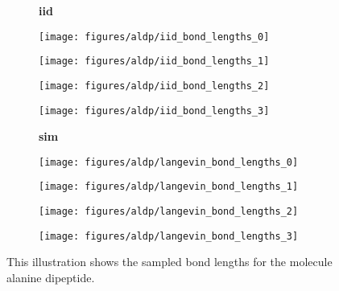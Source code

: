 \begin{figure}
    \centering
    \begin{minipage}{\textwidth}
        \centering
        \begin{subfigure}[c]{0.08\textwidth}
            \textbf{iid}
        \end{subfigure}
        \begin{subfigure}[c]{0.2\textwidth}
            \centering
            \texttt{[image: figures/aldp/iid\_bond\_lengths\_0]}
        \end{subfigure}
        \begin{subfigure}[c]{0.2\textwidth}
            \centering
            \texttt{[image: figures/aldp/iid\_bond\_lengths\_1]}
        \end{subfigure}
        \begin{subfigure}[c]{0.2\textwidth}
            \centering
            \texttt{[image: figures/aldp/iid\_bond\_lengths\_2]}
        \end{subfigure}
        \begin{subfigure}[c]{0.2\textwidth}
            \centering
            \texttt{[image: figures/aldp/iid\_bond\_lengths\_3]}
        \end{subfigure}
    \end{minipage}
    \vspace{0.5cm}
    \begin{minipage}{\textwidth}
        \centering
        \begin{subfigure}[c]{0.08\textwidth}
            \vspace{-0.5cm}
            \textbf{sim}
        \end{subfigure}
        \begin{subfigure}[c]{0.2\textwidth}
            \centering
            \texttt{[image: figures/aldp/langevin\_bond\_lengths\_0]}
        \end{subfigure}
        \begin{subfigure}[c]{0.2\textwidth}
            \centering
            \texttt{[image: figures/aldp/langevin\_bond\_lengths\_1]}
        \end{subfigure}
        \begin{subfigure}[c]{0.2\textwidth}
            \centering
            \texttt{[image: figures/aldp/langevin\_bond\_lengths\_2]}
        \end{subfigure}
        \begin{subfigure}[c]{0.2\textwidth}
            \centering
            \texttt{[image: figures/aldp/langevin\_bond\_lengths\_3]}
        \end{subfigure}
    \end{minipage}
    \caption{This illustration shows the sampled bond lengths for the molecule alanine dipeptide. }
\end{figure}


